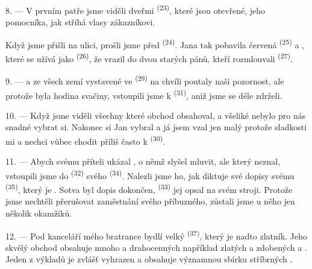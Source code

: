 8. --- V prvním patře jsme viděli dveřmi  \textsuperscript{(23)}, které jsou
otevřené, jeho pomocníka, jak stříhá vlasy zákazníkovi.

Když jsme přišli na ulici, prošli jsme před  \textsuperscript{(24)}. Jana tak
pobavila červená  \textsuperscript{(25)} a , které se
užívá jako  \textsuperscript{(26)}, že vrazil do dvou starých pánů, kteří
rozmlouvali  \textsuperscript{(27)}.

\VUsaut{3.0mm}

9. ---  a  ze všech zemí vystavené ve 
 \textsuperscript{(29)} na chvíli poutaly naši pozornost, ale
protože byla hodina svačiny, vstoupili jsme k  \textsuperscript{(31)}, aniž
jsme se déle zdrželi.

10. --- Když jsme viděli všechny  které obchod obsahoval,
 a všeliké  nebylo pro nás snadné
vybrat si. Nakonec si Jan vybral  a já jsem vzal jen malý
 protože sladkosti mi  a nechci vůbec chodit
příliš často k  \textsuperscript{(30)}.

\VUsaut{3.0mm}

11. --- Abych svému příteli ukázal , o němž slyšel mluvit, ale který
neznal, vstoupili jsme do  \textsuperscript{(32)} svého
 \textsuperscript{(34)}. Nalezli jsme ho, jak diktuje své dopisy svému
 \textsuperscript{(35)}, který je . Sotva byl
dopis dokončen,  \textsuperscript{(33)} jej opsal na svém stroji.
Protože jsme nechtěli přerušovat zaměstnání svého příbuzného, zůstali jsme u něho jen několik
okamžiků.

12. --- Pod kanceláří mého bratrance bydlí velký 
\textsuperscript{(37)}, který je nadto zlatník. Jeho skvělý obchod obsahuje mnoho
  a drahocenných
 například  zlatých 
 a  zdobených  a .
Jeden z výkladů je zvlášť vyhrazen  a obsahuje významnou sbírku
stříbrných .

